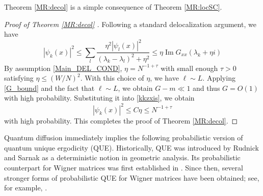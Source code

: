 \documentclass[10pt,reqno]{article}
\DeclareMathOperator{\im}{{\mathrm{Im}}}
\theoremstyle{plain} %
\theoremstyle{remark}
\numberwithin{equation}{section}
\begin{document}
Theorem \ref{MR:decol} is a simple consequence of Theorem \ref{MR:locSC}. 
\begin{proof}[Proof of Theorem \ref{MR:decol} ]
Following a standard delocalization argument, we have
\begin{equation} \label{kkzxis}
|\psi_k(x)|^2\le 
\sum_{l}
\frac{\eta^2|\psi_l(x)|^2 }{(\lambda_k-\lambda_l)^2+\eta^2} 
\le \eta \im G_{xx}(\lambda_k+\eta i)
    \end{equation}
By  assumption  \eqref{Main_DEL_COND},   $\eta=N^{-1+\tau}$ with  small enough $\tau>0$ satisfying 
$ \eta\le (W/N)^2$.
With this choice of $\eta$, we have  $\ell\sim L$. Applying  \eqref{G_bound} and the fact that  $\ell\sim L$, we obtain $G-m\ll1$ and thus  $G=O(1)$ with high probability. Substituting it into  \eqref{kkzxis},  we obtain  
$$
|\psi_k(x)|^2\le C\eta\le N^{-1+\tau}
$$
with high probability.  This  completes the proof of Theorem \ref{MR:decol}.  
\end{proof}
 
Quantum diffusion immediately implies the following probabilistic version of quantum unique ergodicity (QUE). Historically, QUE was introduced by Rudnick and Sarnak \cite{RudSar1994} as a deterministic notion in geometric analysis. Its probabilistic counterpart for Wigner matrices was first established in \cite{vector_flow}. Since then, several stronger forms of probabilistic QUE for Wigner matrices have been obtained; see, for example,
\cite{CIPOLLONI2022109394,CipolloniErdosSchroder2022RankUniform,BenigniLopatto2021LocalQUE,adhikari2023eigenstate,CipolloniErdosHenheik2023EdgeETH}.
\end{document}
